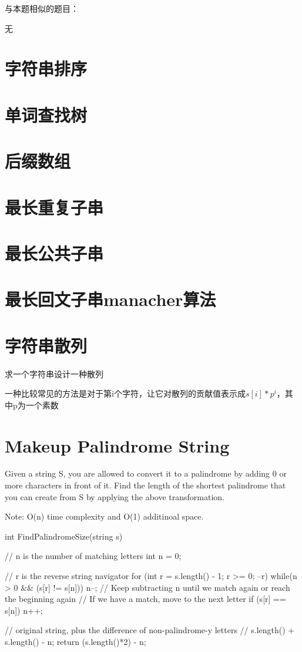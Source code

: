 与本题相似的题目：
\begindot
\item  无
\myenddot


\section{字符串排序} %


\section{单词查找树} %

\section{后缀数组} %
\section{最长重复子串} %
\section{最长公共子串}
\section{最长回文子串manacher算法}
\section{字符串散列}
求一个字符串设计一种散列

一种比较常见的方法是对于第i个字符，让它对散列的贡献值表示成$s[i]*p^i$，其中p为一个素数


\section{Makeup Palindrome String}
Given a string S, you are allowed to convert it to a palindrome by adding 0 or 
more characters in front of it. 
Find the length of the shortest palindrome that you can create from S by 
applying the above transformation. 

Note: O(n) time complexity and O(1) additinoal space.

\begin{Code}
	int FindPalindromeSize(string s){
		// n is the number of matching letters
		int n = 0;
		
		// r is the reverse string navigator
		for (int r = s.length() - 1; r >= 0; --r)
		{
			while(n > 0 && (s[r] != s[n]))
			{
				n--; // Keep subtracting n until we match again or reach the 
				beginning again
			}
			// If we have a match, move to the next letter
			if (s[r] == s[n]) { n++; }
		}
		
		// original string, plus the difference of non-palindrome-y letters
		// s.length() + s.length() - n;
		return (s.length()*2) - n;
	}
\end{Code}

